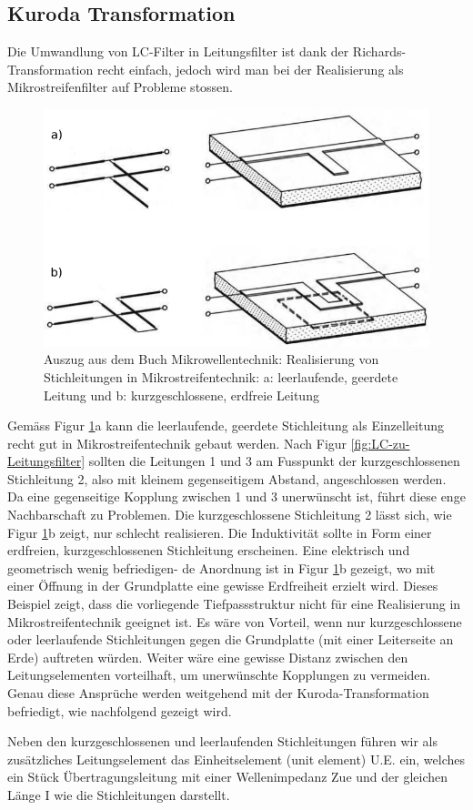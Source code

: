 \subsection{Kuroda Transformation}

Die   Umwandlung   von   LC-Filter   in   Leitungsfilter    ist    dank    der
Richards-Transformation recht einfach, jedoch  wird  man  bei der Realisierung
als Mikrostreifenfilter auf Probleme stossen.

\begin{figure}
    \centering
    \includegraphics[width=\imagewidth]{images/mikrostreifen}
    \caption{Auszug aus dem Buch Mikrowellentechnik\cite[p.~27]{ref:baechold}: Realisierung von Stichleitungen in Mikrostreifentechnik: a: leerlaufende, geerdete Leitung und b: kurzgeschlossene, erdfreie Leitung}
    \label{fig:mikrostreifen}
\end{figure}

Gem\"ass  Figur   \ref{fig:mikrostreifen}a  kann  die  leerlaufende,  geerdete
Stichleitung  als  Einzelleitung  recht  gut  in  Mikrostreifentechnik  gebaut
werden. Nach  Figur \ref{fig:LC-zu-Leitungsfilter} sollten die Leitungen 1 und
3  am  Fusspunkt  der  kurzgeschlossenen  Stichleitung  2,  also  mit  kleinem
gegenseitigem  Abstand,  angeschlossen  werden. Da eine gegenseitige  Kopplung
zwischen  1 und 3 unerw\"unscht  ist,  f\"uhrt  diese  enge  Nachbarschaft  zu
Problemen.  Die  kurzgeschlossene  Stichleitung  2  l\"asst  sich,  wie  Figur
\ref{fig:mikrostreifen}b zeigt,  nur  schlecht realisieren. Die Induktivit\"at
sollte  in Form einer erdfreien,  kurzgeschlossenen  Stichleitung  erscheinen.
Eine elektrisch und geometrisch wenig befriedigen-  de  Anordnung ist in Figur
\ref{fig:mikrostreifen}b gezeigt, wo mit einer  \"Offnung  in  der Grundplatte
eine  gewisse  Erdfreiheit  erzielt  wird.  Dieses  Beispiel  zeigt,  dass die
vorliegende    Tiefpassstruktur    nicht   f\"ur    eine    Realisierung    in
Mikrostreifentechnik   geeignet  ist.  Es  w\"are  von   Vorteil,   wenn   nur
kurzgeschlossene oder leerlaufende  Stichleitungen  gegen die Grundplatte (mit
einer  Leiterseite an Erde) auftreten w\"urden.  Weiter  w\"are  eine  gewisse
Distanz  zwischen  den  Leitungselementen   vorteilhaft,   um   unerw\"unschte
Kopplungen  zu  vermeiden.  Genau  diese Anspr\"uche werden weitgehend mit der
Kuroda-Transformation    befriedigt,    wie    nachfolgend    gezeigt    wird.

Neben den kurzgeschlossenen und leerlaufenden Stichleitungen f\"uhren wir  als
zus\"atzliches  Leitungselement  das  Einheitselement (unit element) U.E. ein,
welches ein St\"uck \"Ubertragungsleitung mit einer Wellenimpedanz Zue und der
gleichen L\"ange I wie die Stichleitungen darstellt.

